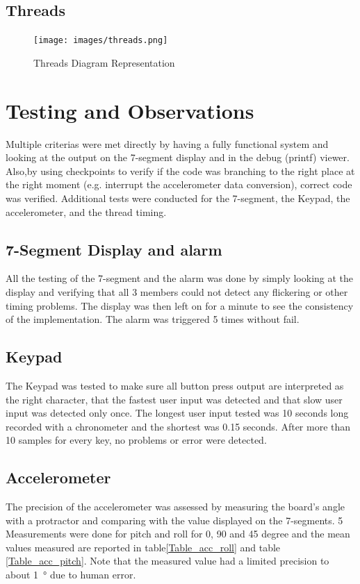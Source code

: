 \documentclass[12pt]{article}
\begin{document}
\subsection{Threads}

\begin{figure}[!htb]
 \centering
 \texttt{[image: images/threads.png]}
 \caption{Threads Diagram Representation}
 \label{fig:threads}
\end{figure}


\section{Testing and Observations}
Multiple criterias were met directly by having a fully functional system and looking at the output on the 7-segment display and in the debug (printf) viewer. Also,by using checkpoints to verify if the code was branching to the right place at the right moment (e.g. interrupt the accelerometer data conversion), correct code was verified. Additional tests were conducted for the 7-segment, the Keypad, the accelerometer, and the thread timing.

\subsection{7-Segment Display and alarm}
All the testing of the 7-segment and the alarm was done by simply looking at the display and verifying that all 3 members could not detect any flickering or other timing problems. The display was then left on for a minute to see the consistency of the implementation. The alarm was triggered 5 times without fail.
\subsection{Keypad}
The Keypad was tested to make sure all button press output are interpreted as the right character, that the fastest user input was detected and that slow user input was detected only once. The longest user input tested was 10 seconds long recorded with a chronometer and the shortest was 0.15 seconds. After more than 10 samples for every key, no problems or error were detected. 

\subsection{Accelerometer}
The precision of the accelerometer was assessed by measuring the board's angle with a protractor and comparing with the value displayed on the 7-segments. 5 Measurements were done for pitch and roll for 0, 90 and 45 degree and the mean values measured are reported in table\ref{Table_acc_roll} and table  \ref{Table_acc_pitch}. Note that the measured value had a limited precision to about \SI{1}{\degree} due to human error.
\end{document}
